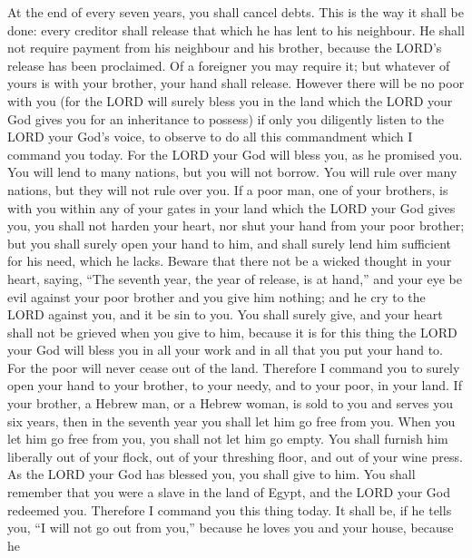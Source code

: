  At the end of every seven years, you shall cancel debts.
 This is the way it shall be done: every creditor shall
release that which he has lent to his neighbour. He shall not require
payment from his neighbour and his brother, because the LORD's release
has been proclaimed.  Of a foreigner you may require it; but
whatever of yours is with your brother, your hand shall release.
 However there will be no poor with you (for the LORD will
surely bless you in the land which the LORD your God gives you for an
inheritance to possess)  if only you diligently listen to
the LORD your God's voice, to observe to do all this commandment which I
command you today.  For the LORD your God will bless you, as
he promised you. You will lend to many nations, but you will not borrow.
You will rule over many nations, but they will not rule over you.
 If a poor man, one of your brothers, is with you within any
of your gates in your land which the LORD your God gives you, you shall
not harden your heart, nor shut your hand from your poor brother;
 but you shall surely open your hand to him, and shall
surely lend him sufficient for his need, which he lacks. 
Beware that there not be a wicked thought in your heart, saying, ``The
seventh year, the year of release, is at hand,'' and your eye be evil
against your poor brother and you give him nothing; and he cry to the
LORD against you, and it be sin to you.  You shall surely
give, and your heart shall not be grieved when you give to him, because
it is for this thing the LORD your God will bless you in all your work
and in all that you put your hand to.  For the poor will
never cease out of the land. Therefore I command you to surely open your
hand to your brother, to your needy, and to your poor, in your land.
 If your brother, a Hebrew man, or a Hebrew woman, is sold
to you and serves you six years, then in the seventh year you shall let
him go free from you.  When you let him go free from you,
you shall not let him go empty.  You shall furnish him
liberally out of your flock, out of your threshing floor, and out of
your wine press. As the LORD your God has blessed you, you shall give to
him.  You shall remember that you were a slave in the land
of Egypt, and the LORD your God redeemed you. Therefore I command you
this thing today.  It shall be, if he tells you, ``I will
not go out from you,'' because he loves you and your house, because he
